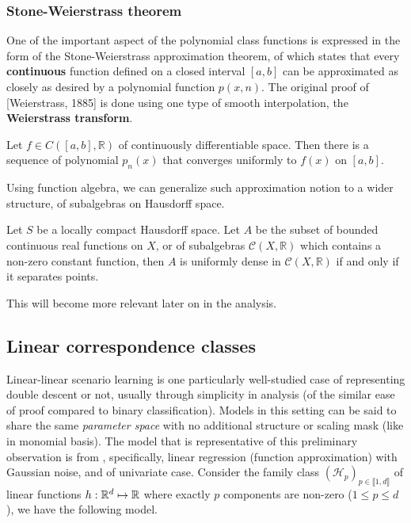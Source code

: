 \documentclass[10pt]{article}
\begin{document}
\subsubsection{Stone-Weierstrass theorem}

One of the important aspect of the polynomial class functions is expressed in the form of the Stone-Weierstrass approximation theorem, of which states that every \textbf{continuous} function defined on a closed interval $[a,b]$ can be approximated as closely as desired by a polynomial function $p(x,n)$. The original proof of [Weierstrass, 1885] is done using one type of smooth interpolation, the \textbf{Weierstrass transform}. 

\begin{theorem}
    Let $f\in C([a,b],\mathbb{R})$ of continuously differentiable space. Then there is a sequence of polynomial $p_n (x)$ that converges uniformly to $f(x)$ on $[a,b]$.     
\end{theorem}

Using function algebra, we can generalize such approximation notion to a wider structure, of subalgebras on Hausdorff space. 

\begin{theorem}
  Let $S$ be a locally compact Hausdorff space. Let $A$ be the subset of bounded continuous real functions on $X$, or of subalgebras $\mathcal{C}(X,\mathbb{R})$ which contains a non-zero constant function, then $A$ is uniformly dense in $\mathcal{C}(X,\mathbb{R})$ if and only if it separates points. 
\end{theorem}

This will become more relevant later on in the analysis. 

\clearpage

\subsection{Linear correspondence classes}

Linear-linear scenario learning is one particularly well-studied case of representing double descent or not, usually through simplicity in analysis (of the similar ease of proof compared to binary classification). Models in this setting can be said to share the same \textit{parameter space} with no additional structure or scaling mask (like in monomial basis). The model that is representative of this preliminary observation is from \cite{lafon_understanding_2024}, specifically, linear regression (function approximation) with Gaussian noise, and of univariate case. Consider the family class $(\mathcal{H}_p)_{p\in\llbracket1,d\rrbracket}$ of linear functions $h:\mathbb{R}^d\mapsto \mathbb{R}$ where exactly $p$ components are non-zero ($1\leq p\leq d$), we have the following model.
\end{document}
